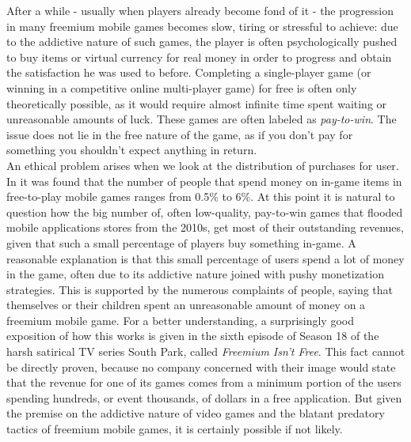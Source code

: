 \documentclass[10pt,a4paper]{article}
\begin{document}
After a while - usually when players already become fond of it - the progression in many freemium mobile games becomes slow, tiring or stressful to achieve: due to the addictive nature of such games, the player is often psychologically pushed to buy items or virtual currency for real money in order to progress and obtain the satisfaction he was used to before.
Completing a single-player game (or winning in a competitive online multi-player game) for free is often only theoretically possible, as it would require almost infinite time spent waiting or unreasonable amounts of luck. These games are often labeled as \textit{pay-to-win}.
The issue does not lie in the free nature of the game, as if you don't pay for something you shouldn't expect anything in return.\\ 
An ethical problem arises when we look at the distribution of purchases for user. 
In \parencite{flurry} it was found that the number of people that spend money on in-game items in free-to-play mobile games ranges from 0.5\% to 6\%.
At this point it is natural to question how the big number of, often low-quality, pay-to-win games that flooded mobile applications stores from the 2010s, get most of their outstanding revenues, given that such a small percentage of players buy something in-game.
A reasonable explanation is that this small percentage of users spend a lot of money in the game, often due to its addictive nature joined with pushy monetization strategies.
This is supported by the numerous complaints of people, saying that themselves or their children spent an unreasonable amount of money on a freemium mobile game.
For a better understanding, a surprisingly good exposition of how this works is given in the sixth episode of Season 18 of the harsh satirical TV series South Park, called \textit{Freemium Isn't Free}.
This fact cannot be directly proven, because no company concerned with their image would state that the revenue for one of its games comes from a minimum portion of the users spending hundreds, or event thousands, of dollars in a free application.
But given the premise on the addictive nature of video games and the blatant predatory tactics of freemium mobile games, it is certainly possible if not likely.
\end{document}
